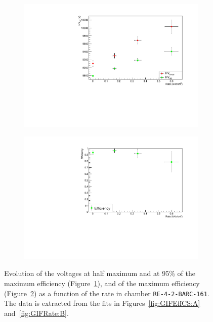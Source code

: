 	\begin{figure}[H]
    	\begin{subfigure}{0.5\linewidth}
			\centering
    		\includegraphics[width = 0.7\plotwidth]{fig/chapt5/HV-Knee-ABS.pdf}
        	\caption{\label{fig:Evolution:A}}
    	\end{subfigure}
    	\begin{subfigure}{0.5\linewidth}
			\centering
    		\includegraphics[width = 0.7\plotwidth]{fig/chapt5/Eff-ABS.pdf}\\
        	\caption{\label{fig:Evolution:B}}
    	\end{subfigure}
		\caption{\label{fig:Evolution} Evolution of the voltages at half maximum and at 95\% of the maximum efficiency (Figure~\ref{fig:Evolution:A}), and of the maximum efficiency (Figure~\ref{fig:Evolution:B}) as a function of the rate in chamber \texttt{RE-4-2-BARC-161}. The data is extracted from the fits in Figures~\ref{fig:GIFEffCS:A} and~\ref{fig:GIFRate:B}.}
	\end{figure}
	
